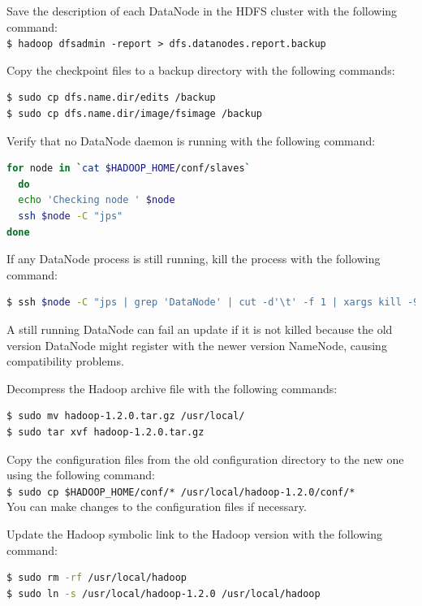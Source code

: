 Save the description of each DataNode in the HDFS cluster with the following command: \\ 
\verb|$ hadoop dfsadmin -report > dfs.datanodes.report.backup| 

Copy the checkpoint files to a backup directory with the following commands:
\lstset{style=bashstyle}
\begin{lstlisting}[language=bash]
$ sudo cp dfs.name.dir/edits /backup
$ sudo cp dfs.name.dir/image/fsimage /backup
\end{lstlisting}

Verify that no DataNode daemon is running with the following command:
\lstset{style=bashstyle}
\begin{lstlisting}[language=bash]
for node in `cat $HADOOP_HOME/conf/slaves`
  do
  echo 'Checking node ' $node
  ssh $node -C "jps"
done
\end{lstlisting}
If any DataNode process is still running, kill the process with the following command:
\lstset{style=bashstyle}
\begin{lstlisting}[language=bash]
$ ssh $node -C "jps | grep 'DataNode' | cut -d'\t' -f 1 | xargs kill -9 "
\end{lstlisting}

A still running DataNode can fail an update if it is not killed because the old version DataNode might register with the newer version NameNode, causing compatibility problems.

Decompress the Hadoop archive file with the following commands:
\lstset{style=bashstyle}
\begin{lstlisting}[language=bash]
$ sudo mv hadoop-1.2.0.tar.gz /usr/local/
$ sudo tar xvf hadoop-1.2.0.tar.gz
\end{lstlisting}

Copy the configuration files from the old configuration directory to the new one using the following command: \\
\verb|$ sudo cp $HADOOP_HOME/conf/* /usr/local/hadoop-1.2.0/conf/*| \\ 

You can make changes to the configuration files if necessary.

Update the Hadoop symbolic link to the Hadoop version with the following command:
\lstset{style=bashstyle}
\begin{lstlisting}[language=bash]
$ sudo rm -rf /usr/local/hadoop
$ sudo ln -s /usr/local/hadoop-1.2.0 /usr/local/hadoop
\end{lstlisting}

